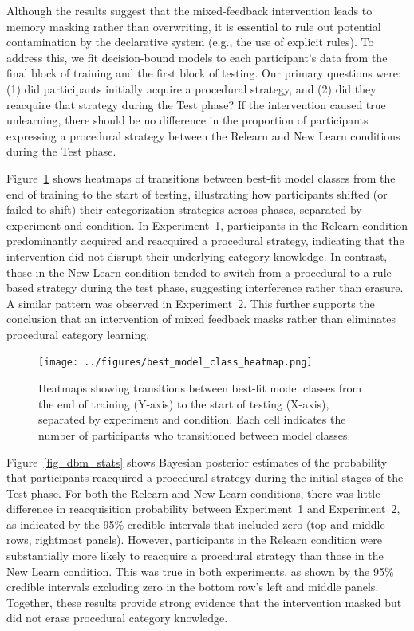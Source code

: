 \documentclass{article}
\begin{document}
Although the results suggest that the mixed-feedback
intervention leads to memory masking rather than
overwriting, it is essential to rule out potential
contamination by the declarative system (e.g., the use of
explicit rules). To address this, we fit decision-bound
models to each participant's data from the final block of
training and the first block of testing. Our primary
questions were: (1) did participants initially acquire a
procedural strategy, and (2) did they reacquire that
strategy during the Test phase? If the intervention caused
true unlearning, there should be no difference in the
proportion of participants expressing a procedural strategy
between the Relearn and New Learn conditions during the Test
phase.

Figure~\ref{fig_dbm_maps} shows heatmaps of transitions
between best-fit model classes from the end of training to
the start of testing, illustrating how participants shifted
(or failed to shift) their categorization strategies across
phases, separated by experiment and condition. In
Experiment~1, participants in the Relearn condition
predominantly acquired and reacquired a procedural strategy,
indicating that the intervention did not disrupt their
underlying category knowledge. In contrast, those in the New
Learn condition tended to switch from a procedural to a
rule-based strategy during the test phase, suggesting
interference rather than erasure. A similar pattern was
observed in Experiment~2. This further supports the
conclusion that an intervention of mixed feedback masks
rather than eliminates procedural category learning.

\begin{figure}[H]
    \centering
    \texttt{[image: ../figures/best\_model\_class\_heatmap.png]}
    \caption{
        Heatmaps showing transitions between best-fit model
        classes from the end of training (Y-axis) to the
        start of testing (X-axis), separated by experiment
        and condition. Each cell indicates the number of
        participants who transitioned between model classes.
}
\label{fig_dbm_maps}
\end{figure}

Figure~\ref{fig_dbm_stats} shows Bayesian posterior
estimates of the probability that participants reacquired a
procedural strategy during the initial stages of the Test
phase. For both the Relearn and New Learn conditions, there
was little difference in reacquisition probability between
Experiment~1 and Experiment~2, as indicated by the 95\%
credible intervals that included zero (top and middle rows,
rightmost panels). However, participants in the Relearn
condition were substantially more likely to reacquire a
procedural strategy than those in the New Learn condition.
This was true in both experiments, as shown by the 95\%
credible intervals excluding zero in the bottom row's left
and middle panels. Together, these results provide strong
evidence that the intervention masked but did not erase
procedural category knowledge.
\end{document}
